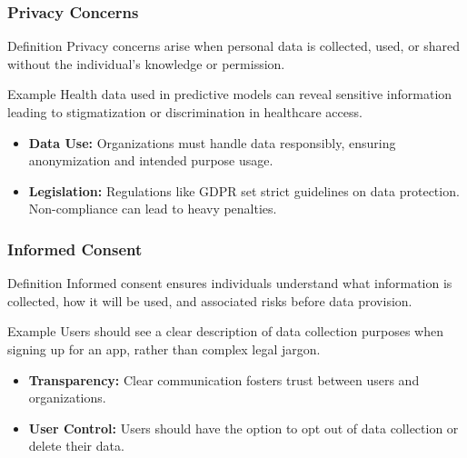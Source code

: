 \documentclass[aspectratio=169]{beamer}
\begin{document}
\begin{frame}[fragile]
    \frametitle{Privacy Concerns}
    \begin{block}{Definition}
        Privacy concerns arise when personal data is collected, used, or shared without the individual's knowledge or permission.
    \end{block}

    \begin{block}{Example}
        Health data used in predictive models can reveal sensitive information leading to stigmatization or discrimination in healthcare access.
    \end{block}

    \begin{itemize}
        \item \textbf{Data Use:} Organizations must handle data responsibly, ensuring anonymization and intended purpose usage.
        \item \textbf{Legislation:} Regulations like GDPR set strict guidelines on data protection. Non-compliance can lead to heavy penalties.
    \end{itemize}
\end{frame}

\begin{frame}[fragile]
    \frametitle{Informed Consent}
    \begin{block}{Definition}
        Informed consent ensures individuals understand what information is collected, how it will be used, and associated risks before data provision.
    \end{block}

    \begin{block}{Example}
        Users should see a clear description of data collection purposes when signing up for an app, rather than complex legal jargon.
    \end{block}

    \begin{itemize}
        \item \textbf{Transparency:} Clear communication fosters trust between users and organizations.
        \item \textbf{User Control:} Users should have the option to opt out of data collection or delete their data.
    \end{itemize}
\end{frame}
\end{document}
